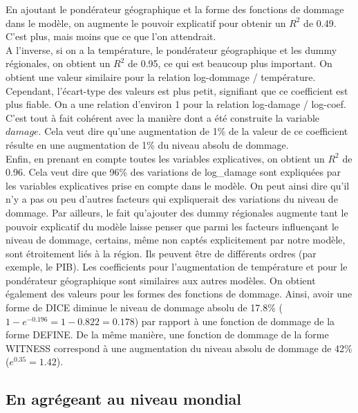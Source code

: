 En ajoutant le pondérateur géographique et la forme des fonctions de dommage dans le modèle, on augmente le pouvoir explicatif pour obtenir un $R^2$ de 0.49. C'est plus, mais moins que ce que l'on attendrait. \\

A l'inverse, si on a la température, le pondérateur géographique et les dummy régionales, on obtient un $R^2$ de 0.95, ce qui est beaucoup plus important. On obtient une valeur similaire pour la relation log-dommage / température. Cependant, l'écart-type des valeurs est plus petit, signifiant que ce coefficient est plus fiable. On a une relation d'environ 1 pour la relation log-damage / log-coef. C'est tout à fait cohérent avec la manière dont a été construite la variable $damage$. Cela veut dire qu'une augmentation de 1\% de la valeur de ce coefficient résulte en une augmentation de 1\% du niveau absolu de dommage. \\


Enfin, en prenant en compte toutes les variables explicatives, on obtient un $R^2$ de 0.96. Cela veut dire que 96\% des variations de log\_damage sont expliquées par les variables explicatives prise en compte dans le modèle. On peut ainsi dire qu'il n'y a pas ou peu d'autres facteurs qui expliquerait des variations du niveau de dommage. Par ailleurs, le fait qu'ajouter des dummy régionales augmente tant le pouvoir explicatif du modèle laisse penser que parmi les facteurs influençant le niveau de dommage, certains, même non captés explicitement par notre modèle, sont étroitement liés à la région. Ils peuvent être de différents ordres (par exemple, le PIB). Les coefficients pour l'augmentation de température et pour le pondérateur géographique sont similaires aux autres modèles. On obtient également des valeurs pour les formes des fonctions de dommage. Ainsi, avoir une forme de DICE diminue le niveau de dommage absolu de 17.8\% ($1 - e^{-0.196}= 1 - 0.822 = 0.178$) par rapport à une fonction de dommage de la forme DEFINE. De la même manière, une fonction de dommage de la forme WITNESS correspond à une augmentation du niveau absolu de dommage de 42\% ($ e^{0.35} = 1.42$). \\

\subsection{En agrégeant au niveau mondial}

\begin{table}
    \centering
    \resizebox{\textwidth}{!}{}
    \label{tab:reg_glob}
\end{table}


